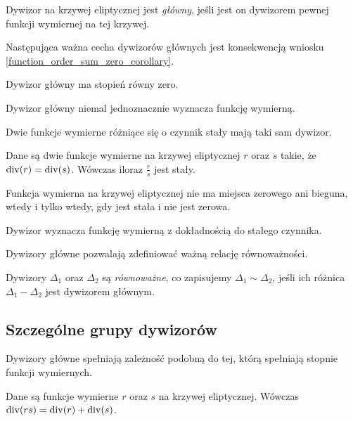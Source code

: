 \begin{definition}
Dywizor na krzywej eliptycznej jest \emph{główny},
jeśli jest on dywizorem pewnej funkcji wymiernej na tej krzywej.
\end{definition}

Następująca ważna cecha dywizorów głównych
jest konsekwencją wniosku \ref{function_order_sum_zero_corollary}.

\begin{fact}
Dywizor główny ma stopień równy zero.
\end{fact}

Dywizor główny niemal jednoznacznie wyznacza funkcję wymierną.

\begin{fact}
Dwie funkcje wymierne różniące się o czynnik stały mają taki sam dywizor.
\end{fact}

\begin{theorem}
Dane są dwie funkcje wymierne na krzywej eliptycznej $r$ oraz $s$ takie,
że $\operatorname{div}(r) = \operatorname{div}(s)$.
Wówczas iloraz $\frac{r}{s}$ jest stały.
\end{theorem}

\begin{corollary}
Funkcja wymierna na krzywej eliptycznej nie ma miejsca zerowego ani bieguna,
wtedy i tylko wtedy, gdy jest stała i nie jest zerowa.
\end{corollary}

\begin{corollary}
Dywizor wyznacza funkcję wymierną z dokładnością do stałego czynnika.
\end{corollary}

Dywizory główne pozwalają zdefiniować ważną relację równoważności.

\begin{definition}
Dywizory $\Delta_1$ oraz $\Delta_2$ są \emph{równoważne},
co zapisujemy $\Delta_1 \sim \Delta_2$,
jeśli ich różnica $\Delta_1 - \Delta_2$ jest dywizorem głównym.
\end{definition}

\subsection*{Szczególne grupy dywizorów}

Dywizory główne spełniają zależność
podobną do tej, którą spełniają stopnie funkcji wymiernych.

\begin{theorem}\label{fun_mul_divi_add_theorem}
Dane są funkcje wymierne $r$ oraz $s$ na krzywej eliptycznej.
Wówczas $\operatorname{div}(rs) = \operatorname{div}(r) + \operatorname{div}(s)$.
\end{theorem}

